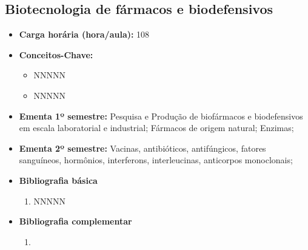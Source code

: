 \documentclass[11pt,fleqn]{book} %
\begin{document}
\newpage
\subsection{Biotecnologia de fármacos e biodefensivos}\label{disc:biotecFarmacos}
\begin{itemize}
	\item \textbf{Carga horária (hora/aula):} 108
	\item \textbf{Conceitos-Chave:}
	\begin{itemize}
		\item NNNNN
		\item NNNNN
	\end{itemize}
	\item \textbf{Ementa 1º semestre:}	 
	Pesquisa e Produção de biofármacos e biodefensivos em escala laboratorial e industrial;
	Fármacos de origem natural;
	Enzimas;
	\item \textbf{Ementa 2º semestre:}	
	Vacinas, antibióticos, antifúngicos, fatores sanguíneos, hormônios, interferons, interleucinas, anticorpos monoclonais; 
	\item \textbf{Bibliografia básica}
	\begin{enumerate}
		\item NNNNN
	\end{enumerate}
	\item \textbf{Bibliografia complementar}
	\begin{enumerate}
		\item 
	\end{enumerate}	
\end{itemize}

\newpage
\end{document}
